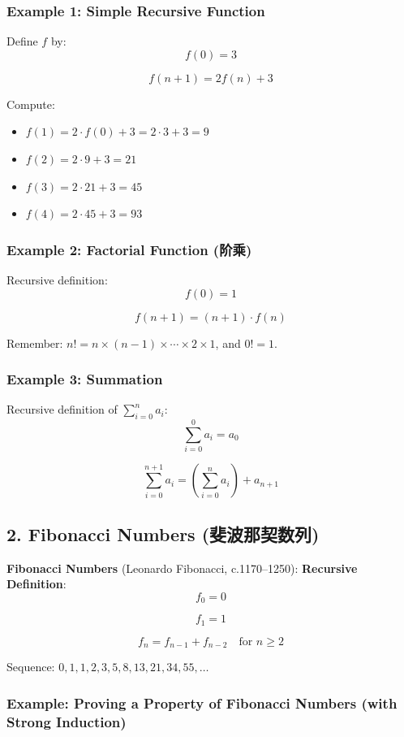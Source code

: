 \documentclass[10pt,a4paper,openany]{ctexbook}
\theoremstyle{definition}
\theoremstyle{remark}
\begin{document}
\subsubsection{Example 1: Simple Recursive Function}

Define $f$ by:
\[
f(0) = 3
\]

\[
f(n+1) = 2f(n) + 3
\]

Compute:
\begin{itemize}
\item $f(1) = 2 \cdot f(0) + 3 = 2 \cdot 3 + 3 = 9$
\item $f(2) = 2 \cdot 9 + 3 = 21$
\item $f(3) = 2 \cdot 21 + 3 = 45$
\item $f(4) = 2 \cdot 45 + 3 = 93$

\end{itemize}

\subsubsection{Example 2: Factorial Function (阶乘)}

Recursive definition:
\[
f(0) = 1
\]

\[
f(n+1) = (n+1) \cdot f(n)
\]

Remember: $n! = n \times (n-1) \times \cdots \times 2 \times 1$, and $0! = 1$.
\subsubsection{Example 3: Summation}

Recursive definition of $\displaystyle \sum_{i=0}^{n} a_i$:
\[
\sum_{i=0}^{0} a_i = a_0
\]

\[
\sum_{i=0}^{n+1} a_i = \left(\sum_{i=0}^{n} a_i\right) + a_{n+1}
\]

\vspace{-2pt}

\subsection{2. Fibonacci Numbers (斐波那契数列)}

\textbf{Fibonacci Numbers} (Leonardo Fibonacci, c.1170–1250):
\textbf{Recursive Definition}:
\[
f_0 = 0
\]

\[
f_1 = 1
\]

\[
f_n = f_{n-1} + f_{n-2} \quad \text{for } n \ge 2
\]

Sequence: $0, 1, 1, 2, 3, 5, 8, 13, 21, 34, 55, \dots$
\subsubsection{Example: Proving a Property of Fibonacci Numbers (with Strong Induction)}
\end{document}
